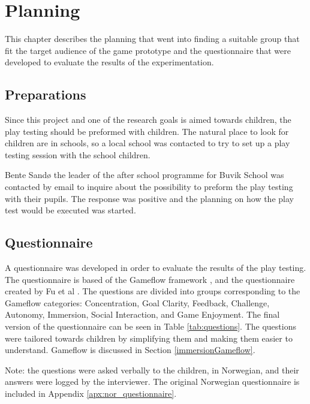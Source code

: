 \chapter{Planning}
This chapter describes the planning that went into finding a suitable group that fit the target audience of the game prototype and the questionnaire that were developed to evaluate the results of the experimentation.


\section{Preparations}
Since this project and one of the research goals is aimed towards children, the play testing should be preformed with children. The natural place to look for children are in schools, so a local school was contacted to try to set up a play testing session with the school children.

Bente Sandø the leader of the after school programme for Buvik School was contacted by email to inquire about the possibility to preform the play testing with their pupils. The response was positive and the planning on how the play test would be executed was started.


\section{Questionnaire}
\label{sec:questionnaire}
A questionnaire was developed in order to evaluate the results of the play testing. The questionnaire is based of the Gameflow framework \cite{sweetser2005gameflow}, and the questionnaire created by Fu et al \cite{fu2009egameflow}. The questions are divided into groups corresponding to the Gameflow categories: Concentration, Goal Clarity, Feedback, Challenge, Autonomy, Immersion, Social Interaction, and Game Enjoyment. The final version of the questionnaire can be seen in Table \ref{tab:questions}. The questions were tailored towards children by simplifying them and making them easier to understand. Gameflow is discussed in Section \ref{immersionGameflow}.

Note: the questions were asked verbally to the children, in Norwegian, and their answers were logged by the interviewer. The original Norwegian questionnaire is included in Appendix \ref{apx:nor_questionnaire}.


